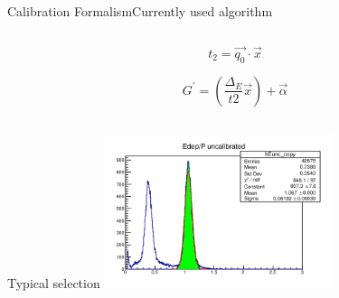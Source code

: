 \documentclass[aspectratio=169,xcolor=dvipsnames]{beamer}
\begin{document}
\begin{frame}{Calibration Formalism}{Currently used algorithm}
\begin{columns}
\begin{column}{0.5\textwidth}
      \[
        t_2 = \vec{q_0}\cdot\vec{x}
      \]

      \[ 
        G^{\prime} = (\frac{\Delta_E}{t2}\vec{x}) + \vec{\alpha}
      \]


%
%      
%
%
%
    \end{column}%
  \end{columns}
 
\end{frame}

\begin{frame}{Typical selection}
  \includegraphics[width = 0.5\textwidth]{run6490uncalib.png}
\end{frame}
\end{document}
